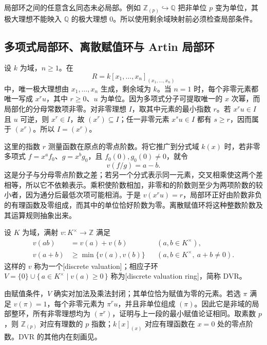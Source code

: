 \ProseParagraphBreak
局部环之间的任意含幺同态未必局部。例如 \(\mathbb Z_{(p)}\hookrightarrow\mathbb Q\) 把非单位 \(p\) 变为单位，其极大理想不能映入 \(\mathbb Q\) 的极大理想 \(0\)。所以使用剩余域映射前必须检查局部条件。

\subsection{多项式局部环、离散赋值环与 Artin 局部环}
\label{b3:subsec:0205:03}

设 \(k\) 为域，\(n\ge1\)。在
\[
	R=k[x_1,\ldots,x_n]_{(x_1,\ldots,x_n)}
\]
中，唯一极大理想由 \(x_1,\ldots,x_n\) 生成，剩余域为 \(k\)。当 \(n=1\) 时，每个非零元素都唯一写成 \(x^r u\)，其中 \(r\ge0\)、\(u\) 为单位。因为多项式分子可提取唯一的 \(x\) 次幂，而局部化的分母常数项非零。对非零理想 \(I\)，取其中元素的最小指数 \(r\)。若 \(x^ru\in I\) 且 \(u\) 可逆，则 \(x^r\in I\)，故 \((x^r)\subseteq I\)；任一非零元素 \(x^su\in I\) 都有 \(s\ge r\)，因而属于 \((x^r)\)。所以 \(I=(x^r)\)。

这里的指数 \(r\) 测量函数在原点的零点阶数。将它推广到分式域 \(k(x)\) 时，若非零多项式 \(f=x^a f_0\)、\(g=x^b g_0\)，且 \(f_0(0),g_0(0)\ne0\)，就令
\[
	v(f/g)=a-b.
\]
这是分子与分母零点阶数之差；若另一个分式表示同一元素，交叉相乘使这两个差相等，所以它不依赖表示。乘积使阶数相加，非零和的阶数则至少为两项阶数的较小者，因为通分后最低次项可能相消。于是 \(v(x^r u)=r\)，局部环正好由阶数非负的有理函数及零组成，而其中的单位恰好阶数为零。离散赋值环将这种整数阶数及其运算规则抽象出来。

\begin{definition}\label{b3:def:discrete-valuation-example}
	设 \(K\) 为域，满射 \(v:K^\times\rightarrow\mathbb Z\) 满足
	\[
		\begin{aligned}
			v(ab)&=v(a)+v(b) &&(a,b\in K^\times),\\
			v(a+b)&\ge\min\bigl\{v(a),v(b)\bigr\} &&(a,b\in K^\times,\ a+b\ne0).
		\end{aligned}
	\]
	这样的 \(v\) 称为一个[discrete valuation]；相应子环 \(V=\{0\}\cup\bigl\{\,a\in K^\times\mid v(a)\ge0\,\bigr\}\) 称为[discrete valuation ring]，简称 DVR。
\end{definition}

由赋值条件，\(V\) 确实对加法及乘法封闭；其单位恰为赋值为零的元素。若选 \(\pi\) 满足 \(v(\pi)=1\)，每个非零元素为 \(\pi^r u\)，并且非单位组成 \((\pi)\)。因此它是非域的局部整环，所有非零理想均为 \((\pi^r)\)，证明与上一段的最小赋值论证相同。取素数 \(p\)，则 \(\mathbb Z_{(p)}\) 对应有理数的 \(p\) 指数；\(k[x]_{(x)}\) 对应有理函数在 \(x=0\) 处的零点阶数。DVR 的其他内在刻画见。

